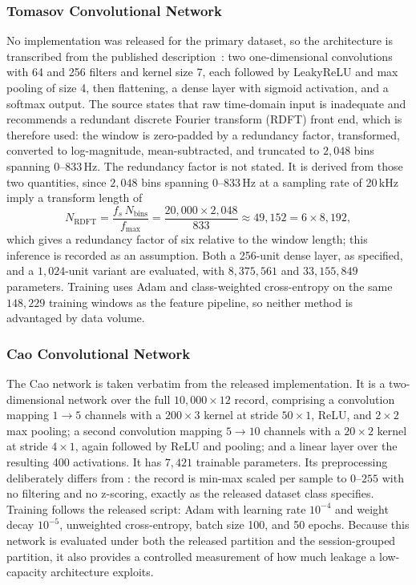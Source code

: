 \subsubsection{Tomasov Convolutional Network}
\label{sec:chap3TomasovCNN}
No implementation was released for the primary dataset, so the architecture is transcribed from the published description~\cite{tomasov2025perimeter}: two one-dimensional convolutions with 64 and 256 filters and kernel size 7, each followed by LeakyReLU and max pooling of size 4, then flattening, a dense layer with sigmoid activation, and a softmax output. The source states that raw time-domain input is inadequate and recommends a redundant discrete Fourier transform (RDFT) front end, which is therefore used: the window is zero-padded by a redundancy factor, transformed, converted to log-magnitude, mean-subtracted, and truncated to $2{,}048$ bins spanning $0$--$833$\,Hz. The redundancy factor is not stated. It is derived from those two quantities, since $2{,}048$ bins spanning 0--833\,Hz at a sampling rate of 20\,kHz imply a transform length of
\begin{equation}
	N_{\mathrm{RDFT}} = \frac{f_s\, N_{\mathrm{bins}}}{f_{\max}} = \frac{20{,}000 \times 2{,}048}{833} \approx 49{,}152 = 6 \times 8{,}192,
	\label{eq:rdft}
\end{equation}
which gives a redundancy factor of six relative to the window length; this inference is recorded as an assumption. Both a 256-unit dense layer, as specified, and a $1{,}024$-unit variant are evaluated, with $8{,}375{,}561$ and $33{,}155{,}849$ parameters. Training uses Adam and class-weighted cross-entropy on the same $148{,}229$ training windows as the feature pipeline, so neither method is advantaged by data volume.

\subsubsection{Cao Convolutional Network}
\label{sec:chap3CaoCNN}
The Cao network is taken verbatim from the released implementation. It is a two-dimensional network over the full $10{,}000 \times 12$ record, comprising a convolution mapping $1 \to 5$ channels with a $200 \times 3$ kernel at stride $50 \times 1$, ReLU, and $2 \times 2$ max pooling; a second convolution mapping $5 \to 10$ channels with a $20 \times 2$ kernel at stride $4 \times 1$, again followed by ReLU and pooling; and a linear layer over the resulting 400 activations. It has $7{,}421$ trainable parameters. Its preprocessing deliberately differs from : the record is min-max scaled per sample to $0$--$255$ with no filtering and no z-scoring, exactly as the released dataset class specifies. Training follows the released script: Adam with learning rate $10^{-4}$ and weight decay $10^{-5}$, unweighted cross-entropy, batch size 100, and 50 epochs. Because this network is evaluated under both the released partition and the session-grouped partition, it also provides a controlled measurement of how much leakage a low-capacity architecture exploits.

